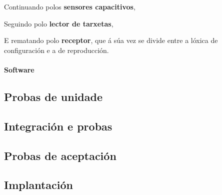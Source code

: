    Continuando polos \textbf{sensores capacitivos}, %
   
   Seguindo polo \textbf{lector de tarxetas}, %
   
   E rematando polo \textbf{receptor}, que á súa vez se divide entre a lóxica
   de configuración e a de reproducción. %
   
   \paragraph{Software}

 \subsection{Probas de unidade}

 \subsection{Integración e probas}

 \subsection{Probas de aceptación}

 \subsection{Implantación}
